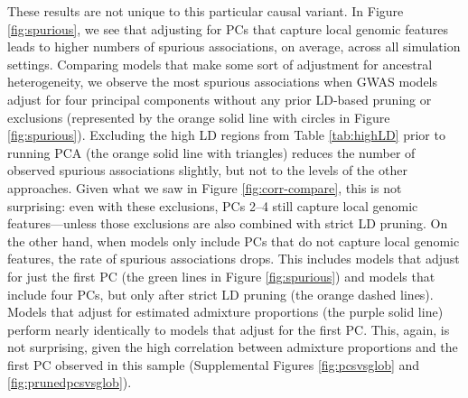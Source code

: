 \documentclass[12pt]{article}
\begin{document}
These results are not unique to this particular causal variant. 
In Figure \ref{fig:spurious}, we see that adjusting for PCs that capture local genomic features leads to higher numbers of spurious associations, on average, across all simulation settings.
Comparing models that make some sort of adjustment for ancestral heterogeneity, we observe the most spurious associations when GWAS models adjust for four principal components without any prior LD-based pruning or exclusions (represented by the orange solid line with circles in Figure \ref{fig:spurious}).
Excluding the high LD regions from Table \ref{tab:highLD} prior to running PCA (the orange solid line with triangles) reduces the number of observed spurious associations slightly, but not to the levels of the other approaches.
Given what we saw in Figure \ref{fig:corr-compare}, this is not surprising: even with these exclusions, PCs 2--4 still capture local genomic features---unless those exclusions are also combined with strict LD pruning.
On the other hand, when models only include PCs that do not capture local genomic features, the rate of spurious associations drops. 
This includes models that adjust for just the first PC (the green lines in Figure \ref{fig:spurious}) and models that include four PCs, but only after strict LD pruning (the orange dashed lines).
Models that adjust for estimated admixture proportions (the purple solid line) perform nearly identically to models that adjust for the first PC.
This, again, is not surprising, given the high correlation between admixture proportions and the first PC observed in this sample (Supplemental Figures \ref{fig:pcsvsglob} and \ref{fig:prunedpcsvsglob}).
\end{document}

